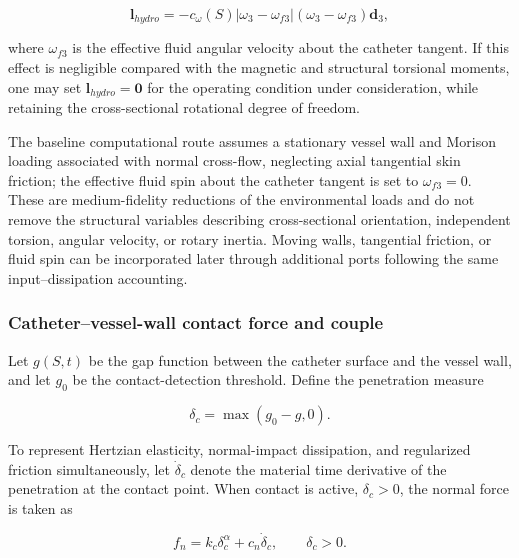 \begin{equation}
\label{eq:rod-1-66}
\mathbf{l}_{hydro} = - c_{\omega}(S)\left| \omega_{3} - \omega_{f3} \right|\left( \omega_{3} - \omega_{f3} \right)\mathbf{d}_{3},
\end{equation}

where \(\omega_{f3}\) is the effective fluid angular velocity about the catheter tangent. If this effect is negligible compared with the magnetic and structural torsional moments, one may set \(\mathbf{l}_{hydro} = \mathbf{0}\) for the operating condition under consideration, while retaining the cross-sectional rotational degree of freedom.

The baseline computational route assumes a stationary vessel wall and Morison loading associated with normal cross-flow, neglecting axial tangential skin friction; the effective fluid spin about the catheter tangent is set to \(\omega_{f3} = 0\). These are medium-fidelity reductions of the environmental loads and do not remove the structural variables describing cross-sectional orientation, independent torsion, angular velocity, or rotary inertia. Moving walls, tangential friction, or fluid spin can be incorporated later through additional ports following the same input--dissipation accounting.

\subsubsection{Catheter--vessel-wall contact force and couple}\label{sec:rod-1-4-5}

Let \(g(S,t)\) be the gap function between the catheter surface and the vessel wall, and let \(g_{0}\) be the contact-detection threshold. Define the penetration measure

\begin{equation}
\label{eq:rod-1-67}
\delta_{c} = \max\left( g_{0} - g,0 \right).
\end{equation}

To represent Hertzian elasticity, normal-impact dissipation, and regularized friction simultaneously, let \({\dot{\delta}}_{c}\) denote the material time derivative of the penetration at the contact point. When contact is active, \(\delta_{c} > 0\), the normal force is taken as\cite{Johnson1985ContactMechanics,HuntCrossley1975Restitution,BrownMcPhee2016Friction}

\begin{equation}
\label{eq:rod-1-68}
f_{n} = k_{c}\delta_{c}^{\alpha} + c_{n}{\dot{\delta}}_{c},\quad\quad\delta_{c} > 0.
\end{equation}

